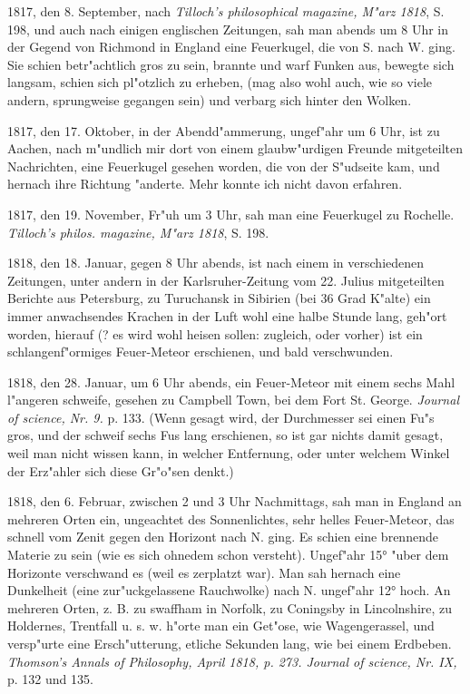 \documentclass[a4paper, 11pt, oneside, polutonikogreek, german]{article}
\begin{document}
1817, den 8. September, nach \emph{Tilloch's philosophical magazine, M"arz 1818}, S. 198, und auch nach einigen englischen Zeitungen, sah man abends um 8 Uhr in der Gegend von Richmond in England eine Feuerkugel, die von S. nach W. ging. Sie schien betr"achtlich gros zu sein, brannte und warf Funken aus, bewegte sich langsam, schien sich pl"otzlich zu erheben, (mag also wohl auch, wie so viele andern, sprungweise gegangen sein) und verbarg sich hinter den Wolken.

1817, den 17. Oktober, in der Abendd"ammerung, ungef"ahr um 6 Uhr, ist zu Aachen, nach m"undlich mir dort von einem glaubw"urdigen Freunde mitgeteilten Nachrichten, eine Feuerkugel gesehen worden, die von der S"udseite kam, und hernach ihre Richtung "anderte. Mehr konnte ich nicht davon erfahren.

1817, den 19. November, Fr"uh um 3 Uhr, sah man eine Feuerkugel zu Rochelle. \emph{Tilloch's philos. magazine, M"arz 1818}, S. 198.

1818, den 18. Januar, gegen 8 Uhr abends, ist nach einem in verschiedenen Zeitungen, unter andern in der Karlsruher-Zeitung vom 22. Julius mitgeteilten Berichte aus Petersburg, zu Turuchansk in Sibirien (bei 36 Grad K"alte) ein immer anwachsendes Krachen in der Luft wohl eine halbe Stunde lang, geh"ort worden, hierauf (? es wird wohl heisen sollen: zugleich, oder vorher) ist ein schlangenf"ormiges Feuer-Meteor erschienen, und bald verschwunden.

1818, den 28. Januar, um 6 Uhr abends, ein Feuer-Meteor mit einem sechs Mahl l"angeren schweife, gesehen zu Campbell Town, bei dem Fort St. George. \emph{Journal of science, Nr. 9.} p. 133. (Wenn gesagt wird, der Durchmesser sei einen Fu"s gros, und der schweif sechs Fus lang erschienen, so ist gar nichts damit gesagt, weil man nicht wissen kann, in welcher Entfernung, oder unter welchem Winkel der Erz"ahler sich diese Gr"o"sen denkt.)

1818, den 6. Februar, zwischen 2 und 3 Uhr Nachmittags, sah man in England an mehreren Orten ein, ungeachtet des Sonnenlichtes, sehr helles Feuer-Meteor, das schnell vom Zenit gegen den Horizont nach N. ging. Es schien eine brennende Materie zu sein (wie es sich ohnedem schon versteht). Ungef"ahr 15° "uber dem Horizonte verschwand es (weil es zerplatzt war). Man sah hernach eine Dunkelheit (eine zur"uckgelassene Rauchwolke) nach N. ungef"ahr 12° hoch. An mehreren Orten, z. B. zu swaffham in Norfolk, zu Coningsby in Lincolnshire, zu Holdernes, Trentfall u. s. w. h"orte man ein Get"ose, wie Wagengerassel, und versp"urte eine Ersch"utterung, etliche Sekunden lang, wie bei einem Erdbeben. \emph{Thomson's Annals of Philosophy, April 1818, p. 273. Journal of science, Nr. IX,} p. 132 und 135.
\end{document}
